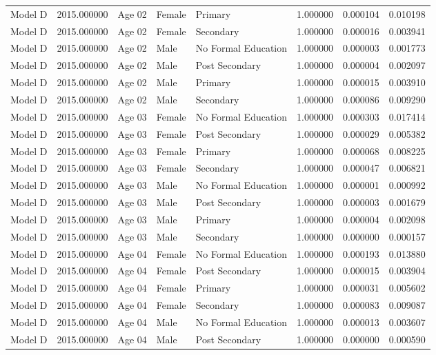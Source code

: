 \begin{table}[ht]
\begin{tabular}{lrlllrrr}
Model D & 2015.000000 & Age 02 & Female & Primary & 1.000000 & 0.000104 & 0.010198 \\
Model D & 2015.000000 & Age 02 & Female & Secondary & 1.000000 & 0.000016 & 0.003941 \\
Model D & 2015.000000 & Age 02 & Male & No Formal Education & 1.000000 & 0.000003 & 0.001773 \\
Model D & 2015.000000 & Age 02 & Male & Post Secondary & 1.000000 & 0.000004 & 0.002097 \\
Model D & 2015.000000 & Age 02 & Male & Primary & 1.000000 & 0.000015 & 0.003910 \\
Model D & 2015.000000 & Age 02 & Male & Secondary & 1.000000 & 0.000086 & 0.009290 \\
Model D & 2015.000000 & Age 03 & Female & No Formal Education & 1.000000 & 0.000303 & 0.017414 \\
Model D & 2015.000000 & Age 03 & Female & Post Secondary & 1.000000 & 0.000029 & 0.005382 \\
Model D & 2015.000000 & Age 03 & Female & Primary & 1.000000 & 0.000068 & 0.008225 \\
Model D & 2015.000000 & Age 03 & Female & Secondary & 1.000000 & 0.000047 & 0.006821 \\
Model D & 2015.000000 & Age 03 & Male & No Formal Education & 1.000000 & 0.000001 & 0.000992 \\
Model D & 2015.000000 & Age 03 & Male & Post Secondary & 1.000000 & 0.000003 & 0.001679 \\
Model D & 2015.000000 & Age 03 & Male & Primary & 1.000000 & 0.000004 & 0.002098 \\
Model D & 2015.000000 & Age 03 & Male & Secondary & 1.000000 & 0.000000 & 0.000157 \\
Model D & 2015.000000 & Age 04 & Female & No Formal Education & 1.000000 & 0.000193 & 0.013880 \\
Model D & 2015.000000 & Age 04 & Female & Post Secondary & 1.000000 & 0.000015 & 0.003904 \\
Model D & 2015.000000 & Age 04 & Female & Primary & 1.000000 & 0.000031 & 0.005602 \\
Model D & 2015.000000 & Age 04 & Female & Secondary & 1.000000 & 0.000083 & 0.009087 \\
Model D & 2015.000000 & Age 04 & Male & No Formal Education & 1.000000 & 0.000013 & 0.003607 \\
Model D & 2015.000000 & Age 04 & Male & Post Secondary & 1.000000 & 0.000000 & 0.000590 \\

\end{tabular}
\end{table}

